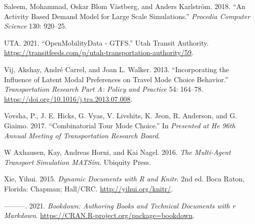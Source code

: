 \documentclass[12pt, oneside, openright]{byuthesis}
\newlength{\cslhangindent}
\newlength{\cslentryspacingunit} %
\newenvironment{CSLReferences}[2] %
 {%
  \setlength{\parindent}{0pt}
  \ifodd #1
  \let\oldpar\par
  \def\par{\hangindent=\cslhangindent\oldpar}
  \fi
  \setlength{\parskip}{#2\cslentryspacingunit}
 }%
 {}
\begin{document}
\begin{CSLReferences}{1}{0}
\leavevmode{}%
Saleem, Mohammad, Oskar Blom Västberg, and Anders Karlström. 2018. {``An Activity Based Demand Model for Large Scale Simulations.''} \emph{Procedia Computer Science} 130: 920--25.

\leavevmode{}%
UTA. 2021. {``OpenMobilityData - GTFS.''} Utah Transit Authority. \url{https://transitfeeds.com/p/utah-transportation-authority/59}.

\leavevmode{}%
Vij, Akshay, André Carrel, and Joan L. Walker. 2013. {``Incorporating the Influence of Latent Modal Preferences on Travel Mode Choice Behavior.''} \emph{Transportation Research Part A: Policy and Practice} 54: 164--78. \url{https://doi.org/10.1016/j.tra.2013.07.008}.

\leavevmode{}%
Vovsha, P., J. E. Hicks, G. Vyas, V. Livshits, K. Jeon, R. Anderson, and G. Giaimo. 2017. {``Combinatorial Tour Mode Choice.''} In \emph{Presented at He 96th Annual Meeting of Transportation Research Board}.

\leavevmode{}%
W Axhausen, Kay, Andreas Horni, and Kai Nagel. 2016. \emph{The Multi-Agent Transport Simulation MATSim}. Ubiquity Press.

\leavevmode{}%
Xie, Yihui. 2015. \emph{Dynamic Documents with {R} and Knitr}. 2nd ed. Boca Raton, Florida: Chapman; Hall/CRC. \url{http://yihui.org/knitr/}.

\leavevmode{}%
---------. 2021. \emph{Bookdown: Authoring Books and Technical Documents with r Markdown}. \url{https://CRAN.R-project.org/package=bookdown}.

\end{CSLReferences}


\end{document}
